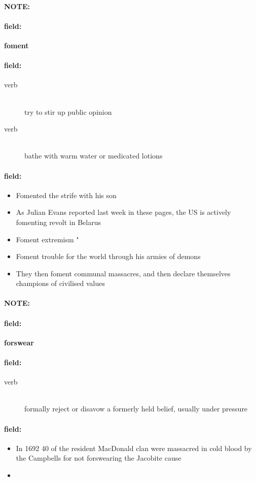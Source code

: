 \documentclass[12pt]{article}
\newenvironment{note}{\paragraph{NOTE:}}{}
\newenvironment{field}{\paragraph{field:}}{}
\begin{document}
\begin{note}
\begin{field}
\textbf{\large foment}
\end{field}


\begin{field}
\begin{description}
\item[verb] \hfill \\ 
try to stir up public opinion

\item[verb] \hfill \\ 
bathe with warm water or medicated lotions

\end{description}
\end{field}

\begin{field}
\begin{itemize}
\item Fomented the strife with his son
\item As Julian Evans reported last week in these pages, the US is actively fomenting revolt in Belarus
\item Foment extremism " 
\item Foment trouble for the world through his armies of demons
\item They then foment communal massacres, and then declare themselves champions of civilised values
\end{itemize}
\end{field}
\end{note}
\begin{note}
\begin{field}
\textbf{\large forswear}
\end{field}


\begin{field}
\begin{description}
\item[verb] \hfill \\ 
formally reject or disavow a formerly held belief, usually under pressure

\end{description}
\end{field}

\begin{field}
\begin{itemize}
\item In 1692 40 of the resident MacDonald clan were massacred in cold blood by the Campbells for not forswearing the Jacobite cause
\item 
\end{itemize}
\end{field}
\end{note}
\end{document}

